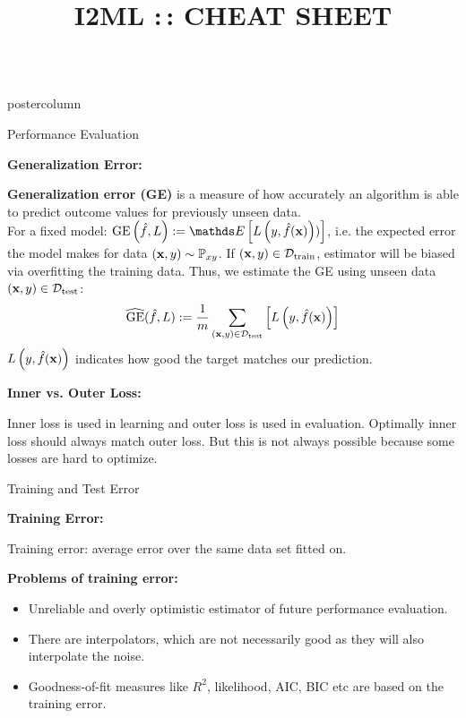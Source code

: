 \documentclass{beamer}
\title{I2ML :\,: CHEAT SHEET} %
\newlength{\columnheight} %
\begin{document}
\begin{frame}[fragile]{}
\begin{columns}
	\begin{column}{.31\textwidth}
		\begin{beamercolorbox}[center]{postercolumn}
			\begin{minipage}{.98\textwidth}
				\parbox[t][\columnheight]{\textwidth}{
          \begin{myblock}{Performance Evaluation}
            \begin{codebox}
							\textbf{Generalization Error:}
						\end{codebox}

            \textbf{Generalization error (GE)} is a measure of how accurately an algorithm is able to predict outcome values for previously unseen data.\\
           For a fixed model: $\GEfL := \E \left[ \Lyfhx) \right]$, i.e. the expected error the model makes for data $(\mathbf{x}, y) \sim \mathbb{P}_{xy}$.
 If $(\mathbf{x}, y) \in \mathcal{D}_{\text{train}}$, estimator will be biased via overfitting the training data.
 Thus, we estimate the GE using unseen data $(\mathbf{x}, y) \in \mathcal{D}_{\text{test}}$:
 $$\widehat{\mathrm{GE}}(\hat{f}, L) := \frac{1}{m}\sum_{(\mathbf{x}, y) \in \mathcal{D}_{\text{test}}} \left[ L\left(y, \hat{f}(\mathbf{x})\right) \right]$$
$L\left(y, \hat{f}(\mathbf{x})\right)$ indicates how good the target matches our prediction.

          \begin{codebox}
            \textbf{Inner vs. Outer Loss:}
          \end{codebox}
          Inner loss is used in learning and outer loss is used in evaluation. 
          Optimally inner loss should always match outer loss. 
          But this is not always possible because some losses are hard to optimize.

					\end{myblock}

          \begin{myblock}{Training and Test Error}
            \begin{codebox}
        \textbf{Training Error: }
      \end{codebox}
        Training error: average error over the same data set fitted on.
        
        \textbf{Problems of training error: }
        \begin{itemize}[$\bullet$]
        \setlength{\itemindent}{+.3in}
        \item Unreliable and overly optimistic estimator of future performance evaluation.
        \item There are interpolators, which are not necessarily good as they will also interpolate the noise.
        \item Goodness-of-fit measures like $R^2$, likelihood, AIC, BIC etc are based on the training error.
        \end{itemize}


\end{myblock}}
\end{minipage}
\end{beamercolorbox}
\end{column}
\end{columns}
\end{frame}
\end{document}
